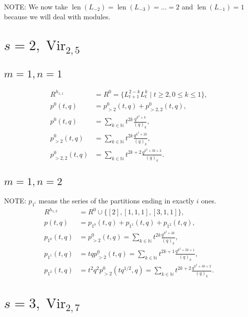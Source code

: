 \documentclass[a4paper, 12pt, reqno]{amsart}
\DeclareMathOperator{\Vir}{Vir}
\DeclareMathOperator{\len}{len}
\begin{document}
NOTE: We now take $\len(L_{-2}) = \len(L_{-3}) = \dots = 2$ and $\len(L_{-1}) = 1$ because we will deal with modules.

\section{$s = 2, \Vir_{2, 5}$}
\label{sec:vir_2-5-1}

\subsection{$m = 1, n = 1$}
\label{sec:m-=-1}

\begin{align*}
  R^{h_{1, 1}} &= R^0 = \{L_{t + 1}^{2 - k}L_t^k \mid t \ge 2, 0 \le k \le 1\}, \\
  p^0(t, q) &= p^0_{>2}(t, q) + p^0_{>2, 2}(t, q), \\
  p^0(t, q) &= \sum_{k \in \mathbb{N}}t^{2k}\frac{q^{k^2 + k}}{(q)_k}, \\
  p^0_{>2}(t, q) &= \sum_{k \in \mathbb{N}}t^{2k}\frac{q^{k^2 + 2k}}{(q)_k}, \\
  p^0_{>2, 2}(t, q) &= \sum_{k \in \mathbb{N}}t^{2k + 2}\frac{q^{k^2 + 3k + 2}}{(q)_k}.
\end{align*}

\subsection{$m = 1, n = 2$}
\label{sec:m-=-1-1}

NOTE: $p_{1^i}$ means the series of the partitions ending in exactly $i$ ones.
\begin{align*}
  R^{h_{1, 2}} &= R^0 \cup \{[2], [1, 1, 1], [3, 1, 1]\}, \\
  p(t, q) &= p_{1^0}(t, q) + p_{1^1}(t, q) + p_{1^2}(t, q), \\
  p_{1^0}(t, q) &= p^0_{>2}(t, q) = \sum_{k \in \mathbb{N}}t^{2k}\frac{q^{k^2 + 2k}}{(q)_k}, \\
  p_{1^1}(t, q) &= tqp^0_{>2}(t, q) = \sum_{k \in \mathbb{N}}t^{2k + 1}\frac{q^{k^2 + 2k + 1}}{(q)_k}, \\
  p_{1^2}(t, q) &= t^2q^2p^0_{>2}(tq^{1/2}, q) = \sum_{k \in \mathbb{N}}t^{2k + 2}\frac{q^{k^2 + 3k + 2}}{(q)_k}.
\end{align*}

\section{$s = 3, \Vir_{2, 7}$}
\label{sec:s-=-3}
\end{document}
